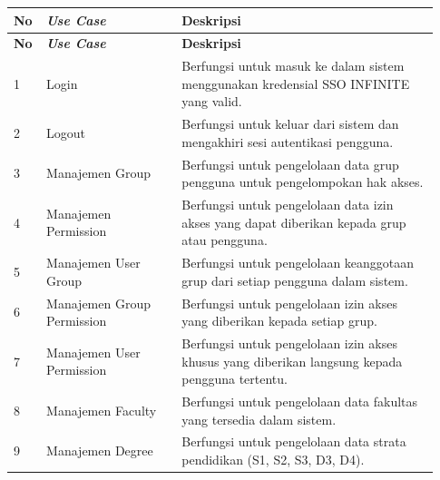 \begin{longtable}{|p{0.05\linewidth}|p{0.30\linewidth}|p{0.58\linewidth}|}
      \hline
      \textbf{No} & \textbf{\textit{Use Case}}             & \textbf{Deskripsi}                                                                                    \\
      \hline
      \endfirsthead

      \hline
      \textbf{No} & \textbf{\textit{Use Case}}             & \textbf{Deskripsi}                                                                                    \\
      \hline
      \endhead

      \hline
      \endfoot

      \hline
      \endlastfoot

      1           & Login                                  & Berfungsi untuk masuk ke dalam sistem menggunakan kredensial SSO INFINITE yang valid.                 \\
      \hline
      2           & Logout                                 & Berfungsi untuk keluar dari sistem dan mengakhiri sesi autentikasi pengguna.                          \\
      \hline
      3           & Manajemen Group                        & Berfungsi untuk pengelolaan data grup pengguna untuk pengelompokan hak akses.                         \\
      \hline
      4           & Manajemen Permission                   & Berfungsi untuk pengelolaan data izin akses yang dapat diberikan kepada grup atau pengguna.           \\
      \hline
      5           & Manajemen User Group                   & Berfungsi untuk pengelolaan keanggotaan grup dari setiap pengguna dalam sistem.                       \\
      \hline
      6           & Manajemen Group Permission             & Berfungsi untuk pengelolaan izin akses yang diberikan kepada setiap grup.                             \\
      \hline
      7           & Manajemen User Permission              & Berfungsi untuk pengelolaan izin akses khusus yang diberikan langsung kepada pengguna tertentu.       \\
      \hline
      8           & Manajemen Faculty                      & Berfungsi untuk pengelolaan data fakultas yang tersedia dalam sistem.                                 \\
      \hline
      9           & Manajemen Degree                       & Berfungsi untuk pengelolaan data strata pendidikan (S1, S2, S3, D3, D4).                              \\

\end{longtable}

